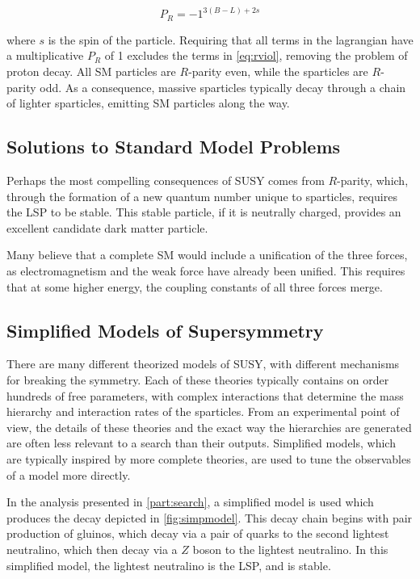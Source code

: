 \begin{equation}
P_R = -1^{3(B-L)+2s}
\end{equation}

where $s$ is the spin of the particle. Requiring that all terms in the lagrangian have a multiplicative $P_R$ of 1 excludes the terms in \autoref{eq:rviol}, removing the problem of proton decay. All \ac{SM} particles are $R$-parity even, while the sparticles are $R$-parity odd. As a consequence, massive sparticles typically decay through a chain of lighter sparticles, emitting \ac{SM} particles along the way.  

\subsection{Solutions to Standard Model Problems}

Perhaps the most compelling consequences of \ac{SUSY} comes from $R$-parity, which, through the formation of a new quantum number unique to sparticles, requires the \acf{LSP} to be stable. This stable particle, if it is neutrally charged, provides an excellent candidate dark matter particle. 

Many believe that a complete \ac{SM} would include a unification of the three forces, as electromagnetism and the weak force have already been unified. This requires that at some higher energy, the coupling constants of all three forces merge. 

\subsection{Simplified Models of Supersymmetry}
\label{sec:simplified_models}

There are many different theorized models of \ac{SUSY}, with different mechanisms for breaking the symmetry. Each of these theories typically contains on order hundreds of free parameters, with complex interactions that determine the mass hierarchy and interaction rates of the sparticles. From an experimental point of view, the details of these theories and the exact way the hierarchies are generated are often less relevant to a search than their outputs. Simplified models, which are typically inspired by more complete theories, are used to tune the observables of a model more directly. 

In the analysis presented in \autoref{part:search}, a simplified model is used which produces the decay depicted in \autoref{fig:simpmodel}. This decay chain begins with pair production of gluinos, which decay via a pair of quarks to the second lightest neutralino, which then decay via a $Z$ boson to the lightest neutralino. In this simplified model, the lightest neutralino is the \ac{LSP}, and is stable.

